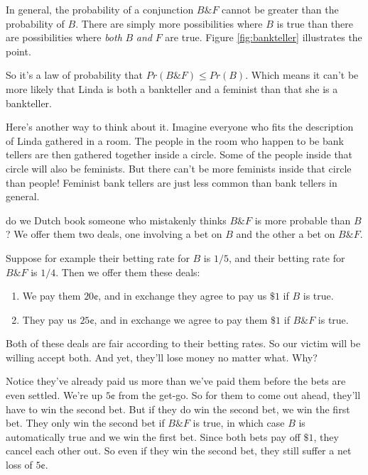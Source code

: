 \documentclass[justified]{tufte-book}
\providecommand{\tightlist}{%
  \setlength{\itemsep}{0pt}\setlength{\parskip}{0pt}}
\renewcommand{\wedge}{\mathbin{\&}}
\newcommand{\p}{Pr}
\theoremstyle{definition}
\theoremstyle{definition}
\theoremstyle{definition}
\theoremstyle{remark}
\begin{document}
In general, the probability of a conjunction \(B \wedge F\) cannot be
greater than the probability of \(B\). There are simply more
possibilities where \(B\) is true than there are possibilities where
\emph{both} \(B\) \emph{and} \(F\) are true. Figure \ref{fig:bankteller}
illustrates the point.

So it's a law of probability that \(\p(B \wedge F) \leq \p(B)\). Which
means it can't be more likely that Linda is both a bankteller and a
feminist than that she is a bankteller.

Here's another way to think about it. Imagine everyone who fits the
description of Linda gathered in a room. The people in the room who
happen to be bank tellers are then gathered together inside a circle.
Some of the people inside that circle will also be feminists. But there
can't be more feminists inside that circle than people! Feminist bank
tellers are just less common than bank tellers in general.

 do we Dutch book someone who mistakenly thinks
\(B \wedge F\) is more probable than \(B\)? We offer them two deals, one
involving a bet on \(B\) and the other a bet on \(B \wedge F\).

Suppose for example their betting rate for \(B\) is \(1/5\), and their
betting rate for \(B \wedge F\) is \(1/4\). Then we offer them these
deals:

\begin{enumerate}
\def\labelenumi{\arabic{enumi}.}
\tightlist
\item
  We pay them \(20\)¢, and in exchange they agree to pay us \(\$1\) if
  \(B\) is true.
\item
  They pay us \(25\)¢, and in exchange we agree to pay them \(\$1\) if
  \(B \wedge F\) is true.
\end{enumerate}

Both of these deals are fair according to their betting rates. So our
victim will be willing accept both. And yet, they'll lose money no
matter what. Why?

Notice they've already paid us more than we've paid them before the bets
are even settled. We're up \(5\)¢ from the get-go. So for them to come
out ahead, they'll have to win the second bet. But if they do win the
second bet, we win the first bet. They only win the second bet if
\(B \wedge F\) is true, in which case \(B\) is automatically true and we
win the first bet. Since both bets pay off \(\$1\), they cancel each
other out. So even if they win the second bet, they still suffer a net
loss of \(5\)¢.
\end{document}
